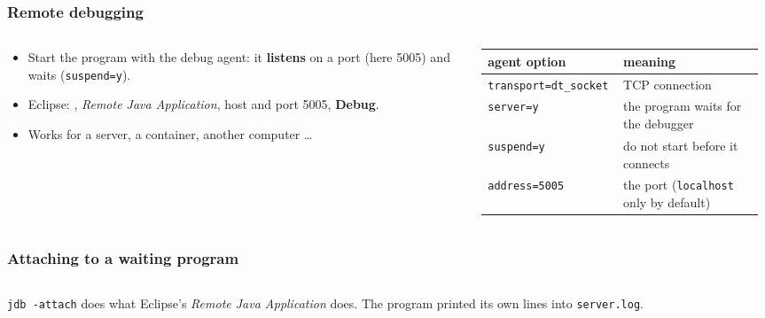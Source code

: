 \documentclass[aspectratio=169,10pt,compress]{beamer}
\begin{document}
\begin{frame}[t,fragile] \frametitle{Remote debugging}
  \begin{columns}[T]
    \begin{column}{0.5\textwidth}
      \begin{itemize}\small
        \item Start the program with the debug agent: it \textbf{listens} on a port (here 5005) and waits (\texttt{suspend=y}).
        \item Eclipse: , \emph{Remote Java Application}, host and port 5005, \textbf{Debug}.
        \item Works for a server, a container, another computer \dots{} 
      \end{itemize}
    \end{column}
    \begin{column}{0.46\textwidth}
      \begin{center}\footnotesize
      \begin{tabular}{@{}L{0.46\linewidth}L{0.5\linewidth}@{}}
        \toprule
        \textbf{agent option}  & \textbf{meaning} \\
        \midrule
        \texttt{transport=dt\_socket} & TCP connection \\
        \texttt{server=y}      & the program waits for the debugger \\
        \texttt{suspend=y}     & do not start before it connects \\
        \texttt{address=5005}  & the port (\texttt{localhost} only by default) \\
        \bottomrule
      \end{tabular}
      \end{center}
    \end{column}
  \end{columns}
\end{frame}




\begin{frame}[t,fragile] \frametitle{Attaching to a waiting program}
  \begin{columns}[T]
    \begin{column}{0.49\textwidth}
    \end{column}
    \begin{column}{0.49\textwidth}
    \end{column}
  \end{columns}

  \vspace{0.1em}
  \small
  \texttt{jdb -attach} does what Eclipse's \emph{Remote Java Application} does. The program printed its own lines into \texttt{server.log}.
\end{frame}
\end{document}
